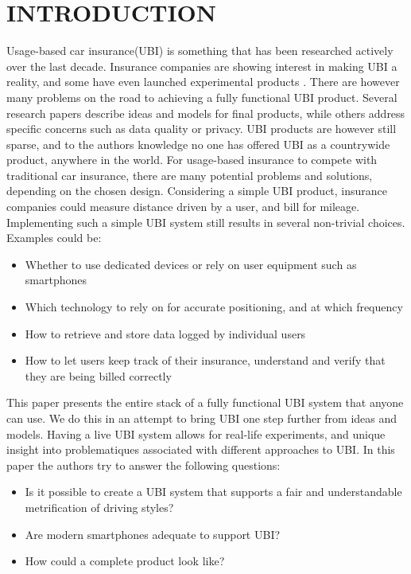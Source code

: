 \section{INTRODUCTION}\label{sec:intro}
Usage-based car insurance(UBI) is something that has been researched actively over the last decade. Insurance companies are showing interest in making UBI a reality, and some have even launched experimental products \citep{allstate_ubi} \citep{progressive_ubi} \citep{qbe_ubi}. There are however many problems on the road to achieving a fully functional UBI product. Several research papers describe ideas and models for final products, while others address specific concerns such as data quality\citep{art:insurtelematics} or privacy\citep{art:pripayd}. UBI products are however still sparse, and to the authors knowledge no one has offered UBI as a countrywide product, anywhere in the world.
For usage-based insurance to compete with traditional car insurance, there are many potential problems and solutions, depending on the chosen design. Considering a simple UBI product, insurance companies could measure distance driven by a user, and bill for mileage. Implementing such a simple UBI system still results in several non-trivial choices. Examples could be:

\begin{itemize}
\item Whether to use dedicated devices or rely on user equipment such as smartphones
\item Which technology to rely on for accurate positioning, and at which frequency
\item How to retrieve and store data logged by individual users
\item How to let users keep track of their insurance, understand and verify that they are being billed correctly
\end{itemize}

This paper presents the entire stack of a fully functional UBI system that anyone can use. We do this in an attempt to bring UBI one step further from ideas and models. Having a live UBI system allows for real-life experiments, and unique insight into problematiques associated with different approaches to UBI. In this paper the authors try to answer the following questions:

\begin{itemize}
\item Is it possible to create a UBI system that supports a fair and understandable metrification of driving styles?
\item Are modern smartphones adequate to support UBI?
\item How could a complete product look like?
\end{itemize}

